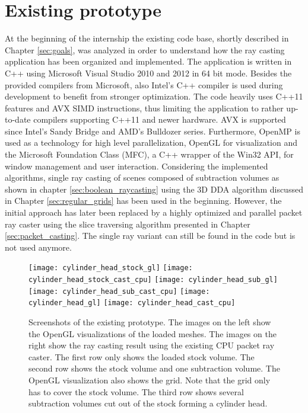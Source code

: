 \section{Existing prototype}
\label{sec:existing_prototype}

At the beginning of the internship the existing code base, shortly described in Chapter \ref{sec:goals}, was analyzed in order to understand how the ray casting application has been organized and implemented. The application is written in C++ using Microsoft Visual Studio 2010 and 2012 in 64 bit mode. Besides the provided compilers from Microsoft, also Intel's C++ compiler is used during development to benefit from stronger optimization. The code heavily uses C++11 features and AVX SIMD instructions, thus limiting the application to rather up-to-date compilers supporting C++11 and newer hardware. AVX is supported since Intel's Sandy Bridge and AMD's Bulldozer series. Furthermore, OpenMP is used as a technology for high level parallelization, OpenGL for visualization and the Microsoft Foundation Class (MFC), a C++ wrapper of the Win32 API, for window management and user interaction.
Considering the implemented algorithms, single ray casting of scenes composed of subtraction volumes as shown in chapter \ref{sec:boolean_raycasting} using the 3D DDA algorithm discussed in Chapter \ref{sec:regular_grids} has been used in the beginning. However, the initial approach has later been replaced by a highly optimized and parallel packet ray caster using the slice traversing algorithm presented in Chapter \ref{sec:packet_casting}. The single ray variant can still be found in the code but is not used anymore.

\begin{figure}
\centering
\texttt{[image: cylinder\_head\_stock\_gl]}
\texttt{[image: cylinder\_head\_stock\_cast\_cpu]}
\texttt{[image: cylinder\_head\_sub\_gl]}
\texttt{[image: cylinder\_head\_sub\_cast\_cpu]}
\texttt{[image: cylinder\_head\_gl]}
\texttt{[image: cylinder\_head\_cast\_cpu]}
\caption{Screenshots of the existing prototype. The images on the left show the OpenGL visualizations of the loaded meshes. The images on the right show the ray casting result using the existing CPU packet ray caster. The first row only shows the loaded stock volume. The second row shows the stock volume and one subtraction volume. The OpenGL visualization also shows the grid. Note that the grid only has to cover the stock volume. The third row shows several subtraction volumes cut out of the stock forming a cylinder head.}
\label{fig:cylinder_head}
\end{figure}

